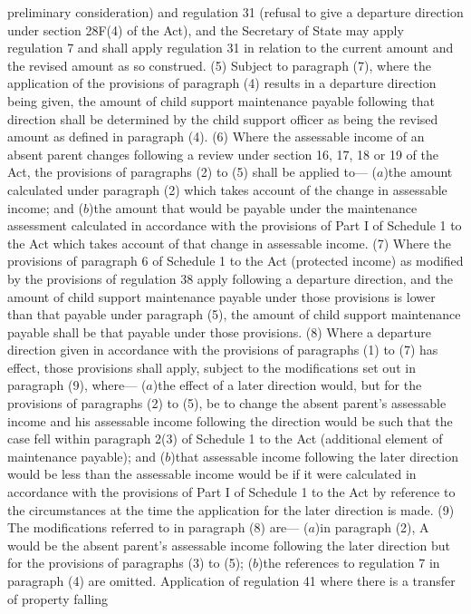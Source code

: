 \documentclass[a4paper]{article}
\begin{document}
preliminary consideration) and regulation 31 (refusal to give a departure
direction under section 28F(4) of the Act), and the Secretary of State may apply
regulation 7 and shall apply regulation 31 in relation to the current amount and
the revised amount as so construed.
(5) Subject to paragraph (7), where the application of the provisions of
paragraph (4) results in a departure direction being given, the amount of child
support maintenance payable following that direction shall be determined by the
child support officer as being the revised amount as defined in paragraph (4).
(6) Where the assessable income of an absent parent changes following a review
under section 16, 17, 18 or 19 of the Act, the provisions of paragraphs (2) to
(5) shall be applied to—
($a$)the amount calculated under paragraph (2) which takes account of the change
in assessable income; and
($b$)the amount that would be payable under the maintenance assessment calculated
in accordance with the provisions of Part I of Schedule 1 to the Act which takes
account of that change in assessable income.
(7) Where the provisions of paragraph 6 of Schedule 1 to the Act (protected
income) as modified by the provisions of regulation 38 apply following a
departure direction, and the amount of child support maintenance payable under
those provisions is lower than that payable under paragraph (5), the amount of
child support maintenance payable shall be that payable under those provisions.
(8) Where a departure direction given in accordance with the provisions of
paragraphs (1) to (7) has effect, those provisions shall apply, subject to the
modifications set out in paragraph (9), where—
($a$)the effect of a later direction would, but for the provisions of paragraphs
(2) to (5), be to change the absent parent’s assessable income and his
assessable income following the direction would be such that the case fell
within paragraph 2(3) of Schedule 1 to the Act (additional element of
maintenance payable); and
($b$)that assessable income following the later direction would be less than the
assessable income would be if it were calculated in accordance with the
provisions of Part I of Schedule 1 to the Act by reference to the circumstances
at the time the application for the later direction is made.
(9) The modifications referred to in paragraph (8) are—
($a$)in paragraph (2), A would be the absent parent’s assessable income following
the later direction but for the provisions of paragraphs (3) to (5);
($b$)the references to regulation 7 in paragraph (4) are omitted.
Application of regulation 41 where there is a transfer of property falling
\end{document}
